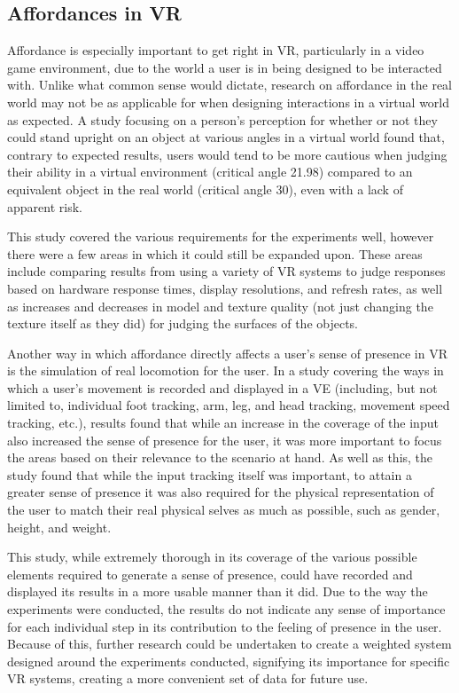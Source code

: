 		\subsection{Affordances in VR}
		\label{lr:vr:affordances}
			Affordance is especially important to get right in VR, particularly in a video game environment, due to the world a user is in being designed to be interacted with.
			Unlike what common sense would dictate, research on affordance in the real world may not be as applicable for when designing interactions in a virtual world as expected.
			A study \cite{Regia-Corte2012} focusing on a person's perception for whether or not they could stand upright on an object at various angles in a virtual world found that, contrary to expected results, users would tend to be more cautious when judging their ability in a virtual environment (critical angle 21.98\degree) compared to an equivalent object in the real world (critical angle 30\degree), even with a lack of apparent risk.

			This study covered the various requirements for the experiments well, however there were a few areas in which it could still be expanded upon.
			These areas include comparing results from using a variety of VR systems to judge responses based on hardware response times, display resolutions, and refresh rates, as well as increases and decreases in model and texture quality (not just changing the texture itself as they did) for judging the surfaces of the objects.

			Another way in which affordance directly affects a user's sense of presence in VR is the simulation of real locomotion for the user.
			In a study \cite{Turchet2015} covering the ways in which a user's movement is recorded and displayed in a VE (including, but not limited to, individual foot tracking, arm, leg, and head tracking, movement speed tracking, etc.), results found that while an increase in the coverage of the input also increased the sense of presence for the user, it was more important to focus the areas based on their relevance to the scenario at hand.
			As well as this, the study found that while the input tracking itself was important, to attain a greater sense of presence it was also required for the physical representation of the user to match their real physical selves as much as possible, such as gender, height, and weight.

			This study, while extremely thorough in its coverage of the various possible elements required to generate a sense of presence, could have recorded and displayed its results in a more usable manner than it did.
			Due to the way the experiments were conducted, the results do not indicate any sense of importance for each individual step in its contribution to the feeling of presence in the user.
			Because of this, further research could be undertaken to create a weighted system designed around the experiments conducted, signifying its importance for specific VR systems, creating a more convenient set of data for future use.

